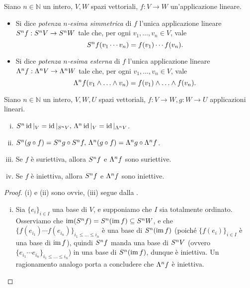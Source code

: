 \begin{definition}
Siano $n\in\mathbb{N}$ un intero, $V\comma W$ spazi vettoriali, $f:V\to W$ un'applicazione lineare.
\begin{itemize}
\item Si dice \emph{potenza $n$-esima simmetrica} di $f$ l'unica applicazione lineare $S^nf:S^nV\to S^nW$ tale che, per ogni $v_1,\ldots,v_n\in V$, vale 
$$
S^nf(v_1\cdots v_n)=f(v_1)\cdots f(v_n).
$$
\item Si dice \emph{potenza $n$-esima esterna} di $f$ l'unica applicazione lineare $\Lambda^nf:\Lambda^nV\to\Lambda^nW$ tale che, per ogni $v_1,\ldots,v_n\in V$, vale
$$
\Lambda^nf(v_1\wedge\ldots\wedge v_n)=f(v_1)\wedge\ldots\wedge f(v_n).
$$
\end{itemize}
\end{definition}

\begin{proposition}
Siano $n\in\mathbb{N}$ un intero, $V\comma W\comma U$ spazi vettoriali, $f:V\to W\comma g:W\to U$ applicazioni lineari.
\begin{enumerate}[(i)]
\item $S^n\operatorname{id}|_V=\operatorname{id}|_{S^nV},\,\allowbreak \Lambda^n\operatorname{id}|_V=\operatorname{id}|_{\Lambda^nV}$.
\item $S^n(g\circ f)=S^ng\circ S^nf,\,\allowbreak \Lambda^n(g\circ f)=\Lambda^ng\circ\Lambda^nf$.
\item Se $f$ è suriettiva, allora $S^nf$ e $\Lambda^nf$ sono suriettive.
\item Se $f$ è iniettiva, allora $S^nf$ e $\Lambda^nf$ sono iniettive.
\end{enumerate}
\end{proposition}
\begin{proof}
(i) e (ii) sono ovvie, (iii) segue dalla .
\begin{enumerate}[(i)]
\addtocounter{enumi}{3}
\item Sia $\{e_i\}_{i\in I}$ una base di $V$, e supponiamo che $I$ sia totalmente ordinato. Osserviamo che $\operatorname{im}(S^nf)=S^n(\operatorname{im} f)\subseteq S^nW$, e che $\{f(e_{i_1})\cdots f(e_{i_n})\}_{i_1\le\ldots\le i_n}$ è una base di $S^n(\operatorname{im} f)$ (poiché $\{f(e_i)\}_{i\in I}$ è una base di $\operatorname{im} f$), quindi $S^n f$ manda una base di $S^nV$ (ovvero $\{e_{i_1}\cdots e_{i_n}\}_{i_1\le\ldots\le i_n}$) in una base di $S^n(\operatorname{im} f)$, dunque è iniettiva. Un ragionamento analogo porta a concludere che $\Lambda^n f$ è iniettiva.
\end{enumerate}
\end{proof}

